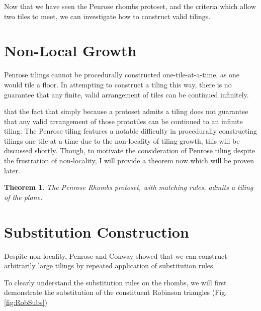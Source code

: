 \documentclass[
  oneside,
  11pt, a4paper,
  footinclude=true,
  headinclude=true,
  cleardoublepage=empty
]{scrbook}
\newtheorem{mythm}{Theorem}
\begin{document}
Now that we have seen the Penrose rhombs protoset, and the criteria which allow two tiles to meet, we can investigate how to construct valid tilings. 


\section{Non-Local Growth}
Penrose tilings cannot be procedurally constructed one-tile-at-a-time, as one would tile a floor. In attempting to construct a tiling this way, there is no guarantee that any finite, valid arrangement of tiles can be continued infinitely. 


 that the fact that simply because a protoset admits a tiling does not guarantee that any valid arrangement of those prototiles can be continued to an infinite tiling. 
The Penrose tiling features a notable difficulty in procedurally constructing tilings one tile at a time due to the non-locality of tiling growth, this will be discussed shortly. Though, to motivate the consideration of Penrose tiling despite the frustration of non-locality, I will provide a theorem now which will be proven later.

\begin{mythm}
The Penrose Rhombs protoset, with matching rules, admits a tiling of the plane.
\end{mythm}

\section{Substitution Construction}
Despite non-locality, Penrose and Conway showed that we can construct arbitrarily large tilings by repeated application of substitution rules.

To clearly understand the substitution rules on the rhombs, we will first demonstrate the substitution of the constituent Robinson triangles (Fig.\ref{fig:RobSubs})
\end{document}
